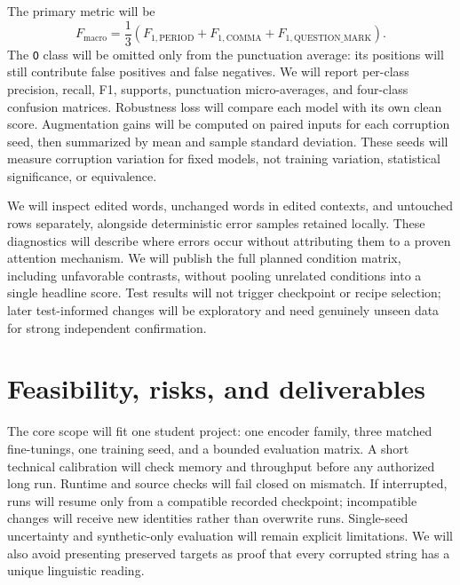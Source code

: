 \documentclass{article}
\begin{document}
The primary metric will be
\[
 F_{\mathrm{macro}}=\frac{1}{3}
 \left(F_{1,\mathrm{PERIOD}}+F_{1,\mathrm{COMMA}}
       +F_{1,\mathrm{QUESTION\_MARK}}\right).
\]
The \texttt{O} class will be omitted only from the punctuation average:
its positions will still contribute false positives and false negatives.
We will report per-class precision, recall, F1, supports, punctuation
micro-averages, and four-class confusion matrices. Robustness loss will compare
each model with its own clean score. Augmentation gains will be computed on
paired inputs for each corruption seed, then summarized by mean and sample
standard deviation. These seeds will measure corruption variation for fixed
models, not training variation, statistical significance, or equivalence.

We will inspect edited words, unchanged words in edited contexts, and untouched
rows separately, alongside deterministic error samples retained locally.
These diagnostics will describe where errors occur without attributing them
to a proven attention mechanism. We will publish the full planned condition
matrix, including unfavorable contrasts, without pooling unrelated conditions
into a single headline score. Test results will not trigger checkpoint or
recipe selection; later test-informed changes will be exploratory and need
genuinely unseen data for strong independent confirmation.

\section{Feasibility, risks, and deliverables}
The core scope will fit one student project: one encoder family, three matched
fine-tunings, one training seed, and a bounded evaluation matrix.
A short technical calibration will check memory and throughput before any
authorized long run. Runtime and source checks will fail closed on mismatch.
If interrupted, runs will resume only from a compatible recorded checkpoint;
incompatible changes will receive new identities rather than overwrite runs.
Single-seed uncertainty and synthetic-only evaluation will remain explicit
limitations. We will also avoid presenting preserved targets as proof that
every corrupted string has a unique linguistic reading.
\end{document}
